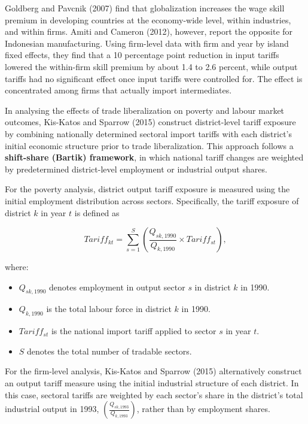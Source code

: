 \documentclass[
  manuscript=article,
  layout=publish,
  year=2026,
  volume=1,
]{den}
\providecommand{\tightlist}{%
  \setlength{\itemsep}{0pt}\setlength{\parskip}{0pt}}
\begin{document}
Goldberg and Pavcnik (2007) find that globalization increases the wage
skill premium in developing countries at the economy-wide level, within
industries, and within firms. Amiti and Cameron (2012), however, report
the opposite for Indonesian manufacturing. Using firm-level data with
firm and year by island fixed effects, they find that a 10 percentage
point reduction in input tariffs lowered the within-firm skill premium
by about 1.4 to 2.6 percent, while output tariffs had no significant
effect once input tariffs were controlled for. The effect is
concentrated among firms that actually import intermediates.

In analysing the effects of trade liberalization on poverty and labour
market outcomes, Kis-Katos and Sparrow (2015) construct district-level
tariff exposure by combining nationally determined sectoral import
tariffs with each district's initial economic structure prior to trade
liberalization. This approach follows a \textbf{shift-share (Bartik)
framework}, in which national tariff changes are weighted by
predetermined district-level employment or industrial output shares.

For the poverty analysis, district output tariff exposure is measured
using the initial employment distribution across sectors. Specifically,
the tariff exposure of district \(k\) in year \(t\) is defined as

\[
Tariff_{kt}
=
\sum_{s=1}^{S}
\left(
\frac{Q_{sk,1990}}{Q_{k,1990}}
\times
Tariff_{st}
\right),
\]

where:

\begin{itemize}
\tightlist
\item
  \(Q_{sk,1990}\) denotes employment in output sector \(s\) in district
  \(k\) in 1990.
\item
  \(Q_{k,1990}\) is the total labour force in district \(k\) in 1990.
\item
  \(Tariff_{st}\) is the national import tariff applied to sector \(s\)
  in year \(t\).
\item
  \(S\) denotes the total number of tradable sectors.
\end{itemize}

For the firm-level analysis, Kis-Katos and Sparrow (2015) alternatively
construct an output tariff measure using the initial industrial
structure of each district. In this case, sectoral tariffs are weighted
by each sector's share in the district's total industrial output in
1993, \(\left(\frac{Q_{sk,1993}}{Q_{k,1993}}\right)\), rather than by
employment shares.
\end{document}
